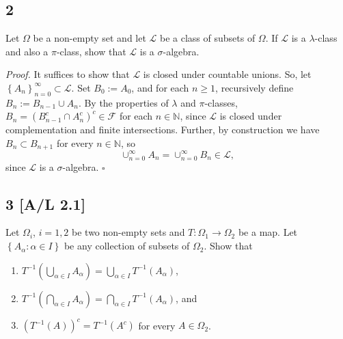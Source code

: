 \documentclass[12pt]{article}
\newcounter{ProofCounter}
\newenvironment{Proof}{\stepcounter{ProofCounter}\textit{Proof.}}{\hfill$\square$}
\begin{document}
\subsection*{2}
\begin{tcolorbox}
Let $\Omega$ be a non-empty set and let $\mathcal{L}$ be a class of subsets of $\Omega$. If $\mathcal{L}$ is a $\lambda$-class and also a $\pi$-class,
show that $\mathcal{L}$ is a $\sigma$-algebra.
\end{tcolorbox}

\begin{Proof}
It suffices to show that $\mathcal{L}$ is closed under countable unions. So, let $\left\{ A_{n} \right\}_{n=0}^{\infty} \subset \mathcal{L}$. Set
$B_{0} := A_{0}$, and for each $n \geq 1$, recursively define $B_{n} := B_{n-1} \cup A_{n}$. By the properties of $\lambda$ and $\pi$-classes, 
$B_{n} = (B_{n-1}^{c} \cap A_{n}^{c})^{c} \in \mathcal{F}$ for each $n \in \mathbb{N}$, since $\mathcal{L}$ is closed under complementation and finite
intersections. Further, by construction we have $B_{n} \subset B_{n+1}$ for every $n \in \mathbb{N}$, so 
\[ \cup_{n=0}^{\infty}A_{n} = \cup_{n=0}^{\infty}B_{n} \in \mathcal{L}, \]
since $\mathcal{L}$ is a $\sigma$-algebra.
\end{Proof}




\subsection*{3 [A/L 2.1]}
\begin{tcolorbox}
Let $\Omega_{i}$, $i = 1,2$ be two non-empty sets and $T : \Omega_{1} \rightarrow \Omega_{2}$ be a map. Let $\left\{ A_{\alpha} : \alpha \in I
\right\}$ be any collection of subsets of $\Omega_{2}$. Show that
\begin{enumerate}[label=(\alph*)]
\item $T^{-1}\left( \bigcup_{\alpha \in I}A_{\alpha} \right) = \bigcup_{\alpha\in I}T^{-1}(A_{\alpha})$, \\

\item $T^{-1}\left( \bigcap_{\alpha \in I} A_\alpha \right) = \bigcap_{\alpha \in I}T^{-1}(A_\alpha)$, and  \\

\item $\left( T^{-1}(A) \right)^{c} = T^{-1}(A^{c})$ for every $A \in \Omega_2$.
\end{enumerate}
\end{tcolorbox}
\end{document}
